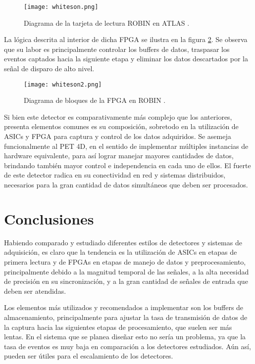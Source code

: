 	\begin{figure}[h]
		\centering
		\texttt{[image: whiteson.png]}
		\caption{Diagrama de la tarjeta de lectura ROBIN en ATLAS \cite{Whiteson2016TheSystem}.}
		\label{fig:whiteson}
	\end{figure}
	
	\newpage
	\par La lógica descrita al interior de dicha FPGA se ilustra en la figura \ref{fig:whiteson2}. Se observa que su labor es principalmente controlar los buffers de datos, traspasar los eventos captados hacia la siguiente etapa y eliminar los datos descartados por la señal de disparo de alto nivel.
	
	\begin{figure}[h]
		\centering
		\texttt{[image: whiteson2.png]}
		\caption{Diagrama de bloques de la FPGA en ROBIN \cite{Whiteson2016TheSystem}.}
		\label{fig:whiteson2}
	\end{figure}
	
	\par Si bien este detector es comparativamente más complejo que los anteriores, presenta elementos comunes es su composición, sobretodo en la utilización de ASICs y FPGA para captura y control de los datos adquiridos. Se asemeja funcionalmente al PET 4D, en el sentido de implementar múltiples instancias de hardware equivalente, para así lograr manejar mayores cantidades de datos, brindando también mayor control e independencia en cada uno de ellos. El fuerte de este detector radica en su conectividad en red y sistemas distribuidos, necesarios para la gran cantidad de datos simultáneos que deben ser procesados. 

\newpage
\section{Conclusiones}
	\par Habiendo comparado y estudiado diferentes estilos de detectores y sistemas de adquisición, es claro que la tendencia es la utilización de ASICs en etapas de primera lectura y de FPGAs en etapas de manejo de datos y preprocesamiento, principalmente debido a la magnitud temporal de las señales, a la alta necesidad de precisión en su sincronización, y a la gran cantidad de señales de entrada que deben ser atendidas.
	
	\par Los elementos más utilizados y recomendados a implementar son los buffers de almacenamiento, principalmente para ajustar la tasa de transmisión de datos de la captura hacia las siguientes etapas de procesamiento, que suelen ser más lentas. En el sistema que se planea diseñar esto no sería un problema, ya que la tasa de eventos es muy baja en comparación a los detectores estudiados. Aún así, pueden ser útiles para el escalamiento de los detectores.
	
